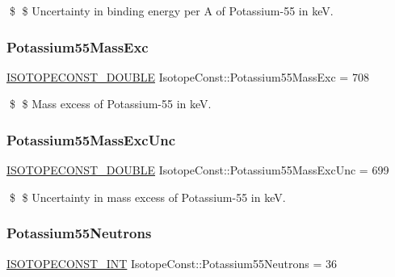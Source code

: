 \$ \$ Uncertainty in binding energy per A of Potassium-\/55 in keV. \mbox{\label{group___isotope_const-_potassium-_k55_ga36f994c515f80f7f4156bab9cda7f0a6}} 
\subsubsection{\texorpdfstring{Potassium55\+Mass\+Exc}{Potassium55MassExc}}
{\footnotesize\ttfamily \mbox{\hyperlink{group___isotope_const-_macros_ga8f45a7272ce02c0b4c65c44636ed719a}{I\+S\+O\+T\+O\+P\+E\+C\+O\+N\+S\+T\+\_\+\+D\+O\+U\+B\+LE}} Isotope\+Const\+::\+Potassium55\+Mass\+Exc = 708}

\$ \$ Mass excess of Potassium-\/55 in keV. \mbox{\label{group___isotope_const-_potassium-_k55_ga0e83bf3a0466b4b019f7c97614e65a07}} 
\subsubsection{\texorpdfstring{Potassium55\+Mass\+Exc\+Unc}{Potassium55MassExcUnc}}
{\footnotesize\ttfamily \mbox{\hyperlink{group___isotope_const-_macros_ga8f45a7272ce02c0b4c65c44636ed719a}{I\+S\+O\+T\+O\+P\+E\+C\+O\+N\+S\+T\+\_\+\+D\+O\+U\+B\+LE}} Isotope\+Const\+::\+Potassium55\+Mass\+Exc\+Unc = 699}

\$ \$ Uncertainty in mass excess of Potassium-\/55 in keV. \mbox{\label{group___isotope_const-_potassium-_k55_ga13f69714aafec112d8a2173e913e4623}} 
\subsubsection{\texorpdfstring{Potassium55\+Neutrons}{Potassium55Neutrons}}
{\footnotesize\ttfamily \mbox{\hyperlink{group___isotope_const-_macros_ga5f18360b3e99483a35c32d789e62621c}{I\+S\+O\+T\+O\+P\+E\+C\+O\+N\+S\+T\+\_\+\+I\+NT}} Isotope\+Const\+::\+Potassium55\+Neutrons = 36}

